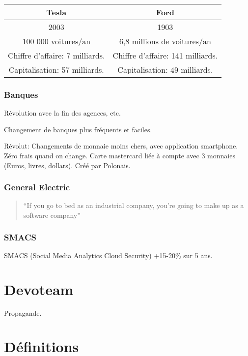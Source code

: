 \documentclass[a4paper,11pt]{article}
\begin{document}
\begin{center}
  \begin{tabular}{|c|c|}
    \hline
    Tesla & Ford \\
    \hline
    2003 & 1903\\
    100 000 voitures/an & 6,8 millions de voitures/an\\
    Chiffre d'affaire: 7 milliards. & Chiffre d'affaire: 141 milliards.\\
    Capitalisation: 57 milliards. & Capitalisation: 49 milliards.\\
    \hline
\end{tabular}
\end{center}

\subsubsection{Banques}

Révolution avec la fin des agences, etc.

Changement de banques plus fréquents et faciles.

Révolut: Changements de monnaie moins chers, avec application smartphone. Zéro
frais quand on change. Carte mastercard liée à compte avec 3 monnaies (Euros,
livres, dollars). Créé par Polonais.

\subsubsection{General Electric}

\begin{quote}
``If you go to bed as an industrial company, you're going to make up as a
software company''
\end{quote}

\subsubsection{SMACS}

SMACS (Social Media Analytics Cloud Security) +15-20\% sur 5 ans.

\section{Devoteam}

Propagande.

\section{Définitions}
\end{document}
